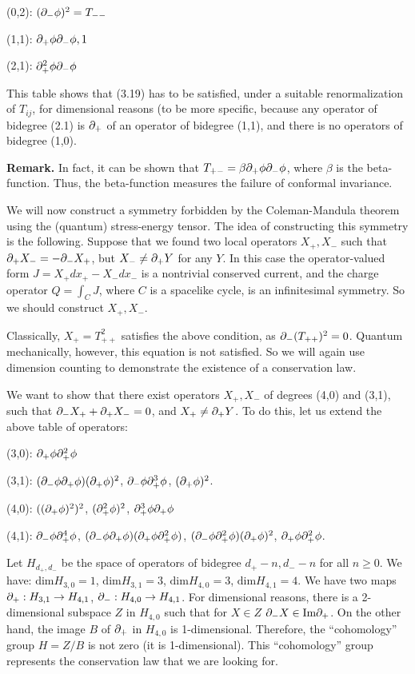 (0,2): $(\partial_-\phi)^2=T_{--}$

(1,1): $\partial_+\phi\partial_-\phi, 1$

(2,1): $\partial_+^2\phi\partial_-\phi$

This table shows that (3.19) has to be satisfied, 
under a suitable renormalization of $T_{ij}$, for dimensional
reasons (to be more specific, because any operator of
bidegree (2.1) is $\partial_+$ of an operator of bidegree (1,1), and
there is no operators of bidegree (1,0). 

{\bf Remark.} In fact, it can be shown that $T_{+-}=\beta\partial_+\phi\partial_-\phi$,
where $\beta$ is the beta-function. Thus, the beta-function measures the 
failure of conformal invariance. 

We will now construct a symmetry forbidden by the Coleman-Mandula theorem
using the (quantum) stress-energy tensor. The idea of constructing this 
symmetry is the following. Suppose that we found two 
local operators $X_+,X_-$ such that $\partial_+X_-=-\partial_-X_+$, but 
$X_-\ne  \partial_+ Y$ for any $Y$. In this case the 
operator-valued form $J=X_+dx_+-X_-dx_-$ is a nontrivial conserved current, 
and the charge operator $Q=\int_CJ$, where $C$ is a spacelike cycle, is
an infinitesimal symmetry. So we should construct $X_+,X_-$. 

Classically, $X_+=T_{++}^2$ satisfies the above condition, as
$\partial_-(T_{++})^2=0$. Quantum mechanically, however, this 
equation is not satisfied. 
So we will again use dimension counting to demonstrate the existence
of a conservation law.

We want to show that there exist 
operators $X_+,X_-$ of degrees (4,0) and (3,1), 
such that $\partial_-X_++\partial_+X_-=0$, and $X_+\ne  \partial_+ Y$. 
To do this, let us extend 
the above table of operators:

(3,0): $\partial_+\phi\partial_+^2\phi$

(3,1): $(\partial_-\phi\partial_+\phi)(\partial_+\phi)^2$, 
$\partial_-\phi\partial_+^3\phi$, $(\partial_+\phi)^2$. 

(4,0): $((\partial_+\phi)^2)^2$, $(\partial_+^2\phi)^2$, $\partial_+^3\phi\partial_+\phi$

(4,1): $\partial_-\phi\partial_+^4\phi$, 
$(\partial_-\phi\partial_+\phi)(\partial_+\phi\partial_+^2\phi)$, $(\partial_-\phi\partial_+^2\phi)(\partial_+\phi)^2$, 
$\partial_+\phi\partial_+^2\phi$. 

Let $H_{d_+,d_-}$ be the space of operators of bidegree $d_+-n,d_--n$
for all $n\ge 0$.
We have: $\text{dim}H_{3,0}=1$, $\text{dim}H_{3,1}=3$,
$\text{dim}H_{4,0}=3$, $\text{dim}H_{4,1}=4$.
We have two maps $\partial_+: H_{3,1}\to H_{4,1}$, $\partial_-: H_{4,0}\to H_{4,1}$. 
For dimensional reasons, there is a 2-dimensional subspace $Z$ in
$H_{4,0}$ such that for $X\in Z$ $\partial_-X\in \text{Im}\partial_+$. 
On the other hand, the image $B$ of $\partial_+$ in $H_{4,0}$ is 1-dimensional.
Therefore, the ``cohomology'' group $H=Z/B$ is not zero (it is 1-dimensional).
This ``cohomology'' group represents the conservation law that we are looking 
for.     

